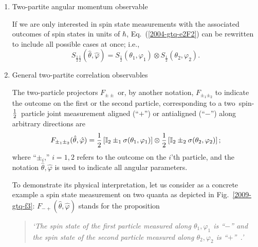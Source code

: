 \documentclass[fleqn,twoside]{article}      %
\begin{document}
\begin{enumerate}

\item{Two-partite angular momentum observable}

If we are only interested in spin state measurements with the associated outcomes of spin states in units of $\hbar$,
Eq.~(\ref{2004-gtq-e2F2}) can be rewritten to include all possible cases at once; i.e.,
\begin{equation}
 S_{\frac{1}{2} \frac{1}{2} } ({\hat \theta},{\hat \varphi} ) =
S_{\frac{1}{2} }( \theta_1,\varphi_1 )
\otimes
S_{\frac{1}{2} }( \theta_2,\varphi_2 ).
\label{2004-gtq-e2F2nat}
\end{equation}

\item{General two-partite correlation observables}


The two-particle projectors
$F_{\pm \pm }$ or, by another notation, $F_{\pm_1 \pm_2 }$ to indicate the outcome on the first or the second particle,
corresponding to a two~spin-${1\over 2}$~particle joint measurement
aligned (``$+$'') or antialigned  (``$-$'') along arbitrary directions are
\begin{equation}
 F_{\pm_1 \pm_2 } ({\hat \theta},{\hat \varphi} ) =
{\frac{1}{2}}\left[{\mathbb I}_2 \pm_1 {\bf \sigma}( \theta_1,\varphi_1 )\right]
\otimes
{\frac{1}{2}}\left[{\mathbb I}_2 \pm_2 {\bf \sigma}( \theta_2,\varphi_2 )\right];
\label{2004-gtq-e2F2}
\end{equation}
where ``$\pm_i$,'' $i=1,2$ refers to the outcome on the $i$'th particle,
and the notation ${\hat \theta},{\hat \varphi}$ is used to indicate all angular parameters.

To demonstrate its physical interpretation, let us consider as a concrete example
a spin state measurement on two quanta as depicted in Fig.~\ref{2009-gtq-f3}:
$F_{- +  } ({\hat \theta},{\hat \varphi} )$ stands for the proposition
\begin{quote}
{\em `The spin state of the first particle measured along $\theta_1,\varphi_1$ is ``$-$''
      and
      the spin state of the second particle measured along $\theta_2,\varphi_2$ is ``$+$''~.'
}
\end{quote}


\end{enumerate}
\end{document}
